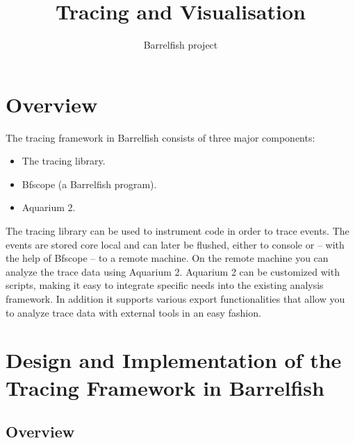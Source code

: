 \documentclass[a4paper,11pt,twoside]{report}
\title{Tracing and Visualisation}
\author{Barrelfish project}
\begin{document}
\maketitle			%

\begin{versionhistory}
\end{versionhistory}



\chapter{Overview}

The tracing framework in Barrelfish consists of three major components:

\begin{itemize}
	\item The tracing library.
	\item Bfscope (a Barrelfish program).
	\item Aquarium 2.
\end{itemize}

The tracing library can be used to instrument code in order to trace events.
The events are stored core local and can later be flushed, either to console
or -- with the help of Bfscope -- to a remote machine. On the remote machine
you can analyze the trace data using Aquarium 2. Aquarium 2 can be customized with scripts,
making it easy to integrate specific needs into the existing analysis framework.
In addition it supports various export functionalities that allow you to analyze
trace data with external tools in an easy fashion.

\chapter{Design and Implementation of the Tracing Framework in Barrelfish}

\section{Overview\label{sec:trace-overview}}
\end{document}
